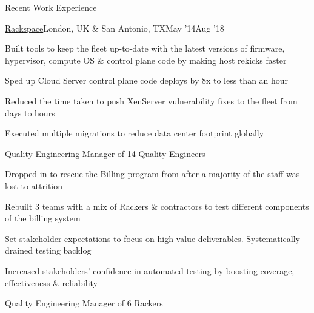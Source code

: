 \documentclass{resume} %
\begin{document}
\begin{rSection}{Recent Work Experience}
\begin{rSubsection}{\href{https://www.rackspace.com/}{Rackspace}}{London, UK \& San Antonio, TX}{May '14}{Aug '18}
    \item Built tools to keep the fleet up-to-date with the latest versions of firmware, hypervisor, compute OS \& control plane code by making host rekicks faster
    \item Sped up Cloud Server control plane code deploys by 8x to less than an hour
    \item Reduced the time taken to push XenServer vulnerability fixes to the fleet from days to hours
    \item Executed multiple migrations to reduce data center footprint globally

\end{rSubsection}\vspace{-1em}

  
\begin{rSubsection}{}{}{}{}
{Quality Engineering Manager of 14 Quality Engineers}
  \item Dropped in to rescue the Billing program from after a majority of the staff was lost to attrition
    \item Rebuilt 3 teams with a mix of Rackers \& contractors to test different components of the billing system
\item Set stakeholder expectations to focus on high value deliverables. Systematically drained testing backlog
\item Increased stakeholders' confidence in automated testing by boosting coverage, effectiveness \& reliability
  
\end{rSubsection}\vspace{-1em}



\begin{rSubsection}{}{}{}{}
{Quality Engineering Manager of 6 Rackers}


\end{rSubsection}
\end{rSection}
\end{document}
